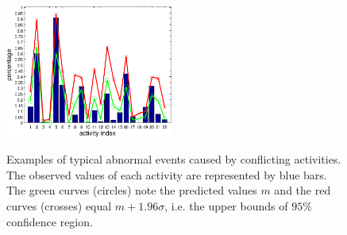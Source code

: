 \begin{figure}[!htbp]
{\begin{minipage}{0.45\linewidth}
			\vfill
			\centering\includegraphics[width = 5.5cm]{figures/qmul/abnormal/jw_1141_hist-crop.pdf}
			\label{fig:qmul_uturn}
		\end{minipage}
	}
	\hfill
	\caption[Abnormal Events caused by conflicting activities]{Examples of typical abnormal events caused by conflicting activities. The observed values of each activity are represented by blue bars. The green curves (circles) note the predicted values $m$ and the red curves (crosses) equal $m+1.96\sigma$, i.e. the upper bounds of $95\%$ confidence region.}
	\label{fig:qmul:conflict_activities}
\end{figure}

